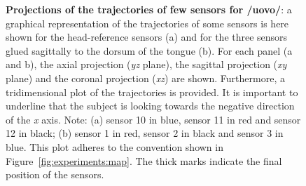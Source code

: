 \begin{figure}
  \centering
	\hspace{0.05\textwidth}

	\caption[Projections of the trajectories of some sensors for 
	/uovo/]{\textbf{Projections of the trajectories of few sensors for /uovo/}: 
	a graphical representation of the trajectories of some sensors is here
	shown for the head-reference sensors (a) and for the three sensors glued 
	sagittally to the dorsum of the tongue (b).
	For each panel (a and b), the axial projection (\emph{yz} plane), 
	the sagittal
	projection (\emph{xy} plane) and the coronal projection (\emph{xz}) are
	shown.
	Furthermore, a tridimensional plot of the trajectories is provided.
	It is important to underline that the subject is looking towards the
	negative direction of the \emph{x} axis.
	Note: (a) sensor 10 in blue, sensor 11 in red and sensor 12 in black; 
	(b) sensor 1 in red, sensor 2 in black and sensor 3 in blue.
	This plot adheres to the convention shown in 
	Figure~\ref{fig:experiments:map}.
	The thick marks indicate the final position of the sensors.
	}
	\label{fig:results:uovo:complex}
\end{figure}
